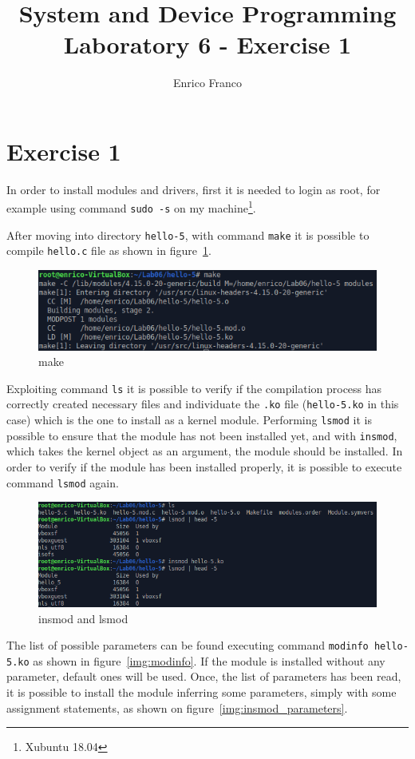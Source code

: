 \documentclass{report}
\author{Enrico Franco}
\title{System and Device Programming \\
	Laboratory 6 - Exercise 1}
\begin{document}
\section*{Exercise 1}
In order to install modules and drivers, first it is needed to login as root, for example using command \texttt{sudo -s} on my machine\footnote{Xubuntu 18.04}.

After moving into directory \texttt{hello-5}, with command \texttt{make} it is possible to compile \texttt{hello.c} file as shown in figure~\ref{img:make}.

\begin{figure}[hbtp]
\centering
\includegraphics[scale=0.45]{images/es01/make.png}
\caption{make}
\label{img:make}
\end{figure}

Exploiting command \texttt{ls} it is possible to verify if the compilation process has correctly created necessary files and individuate the \texttt{.ko} file (\texttt{hello-5.ko} in this case) which is the one to install as a kernel module. Performing \texttt{lsmod} it is possible to ensure that the module has not been installed yet, and with \texttt{insmod}, which takes the kernel object as an argument, the module should be installed. In order to verify if the module has been installed properly, it is possible to execute command \texttt{lsmod} again.

\begin{figure}[hbtp]
\centering
\includegraphics[scale=0.45]{images/es01/insmod_lsmod.png}
\caption{insmod and lsmod}
\label{img:insmod_lsmod}
\end{figure}

The list of possible parameters can be found executing command \texttt{modinfo hello-5.ko} as shown in figure~\ref{img:modinfo}. If the module is installed without any parameter, default ones will be used. Once, the list of parameters has been read, it is possible to install the module inferring some parameters, simply with some assignment statements, as shown on figure~\ref{img:insmod_parameters}.
\end{document}
